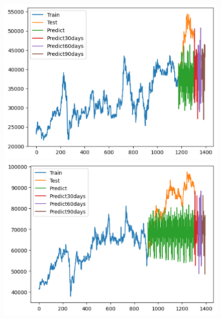 \begin{figure}[H]
\begin{minipage}{0.15\textwidth}
    \centering
    \includegraphics[width=1\textwidth]{resources/chapter-5/newdata1/result/BIDV_ML_9_1.png}
    \end{minipage}
    \hfill
    \begin{minipage}{0.15\textwidth}
    \centering
    \includegraphics[width=1\textwidth]{resources/chapter-5/newdata1/result/VCB_ML_7_3.png}
    \end{minipage}
    \hfill
    \begin{minipage}{0.15\textwidth}
    \centering

\end{minipage}
\end{figure}
